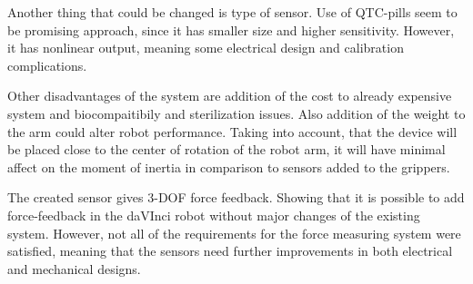 	Another thing that could be changed is type of sensor. Use of QTC-pills seem to be promising approach, since it has smaller size and higher sensitivity. However, it has nonlinear output, meaning some electrical design and calibration complications.
	
Other disadvantages of the system are addition of the cost to already expensive system and biocompaitibily and sterilization issues. Also addition of the weight to the arm could alter robot performance. Taking into account, that the device will be placed close to the center of rotation of the robot arm, it will have minimal affect on the moment of inertia in comparison to sensors added to the grippers.


The created sensor gives 3-DOF force feedback. Showing that it is possible to add force-feedback in the daVInci robot without major changes of the existing system. However, not all of the requirements for the force measuring system were satisfied, meaning that the sensors need further improvements in both electrical and mechanical designs.